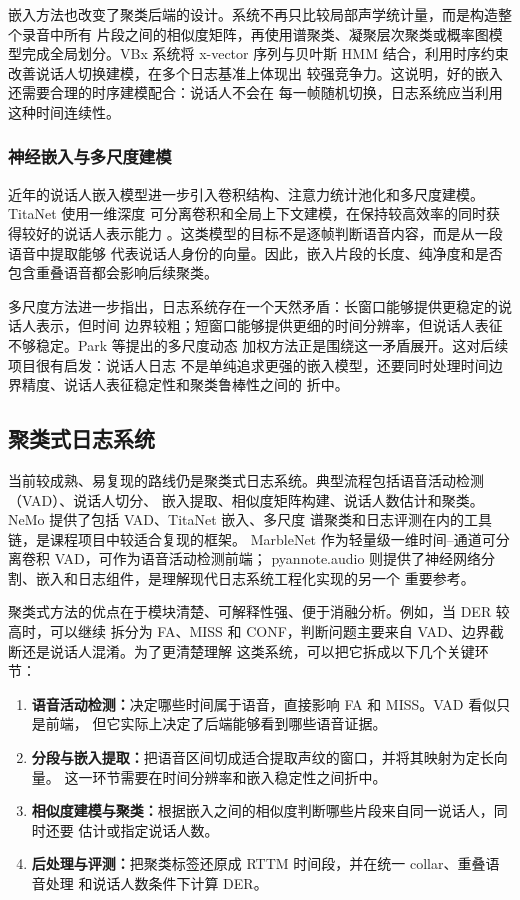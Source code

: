 \documentclass[UTF8,a4paper,10pt]{ctexart}
\begin{document}
嵌入方法也改变了聚类后端的设计。系统不再只比较局部声学统计量，而是构造整个录音中所有
片段之间的相似度矩阵，再使用谱聚类、凝聚层次聚类或概率图模型完成全局划分。VBx 系统将
x-vector 序列与贝叶斯 HMM 结合，利用时序约束改善说话人切换建模，在多个日志基准上体现出
较强竞争力\cite{landini2020vbx}。这说明，好的嵌入还需要合理的时序建模配合：说话人不会在
每一帧随机切换，日志系统应当利用这种时间连续性。

\subsubsection{神经嵌入与多尺度建模}

近年的说话人嵌入模型进一步引入卷积结构、注意力统计池化和多尺度建模。TitaNet 使用一维深度
可分离卷积和全局上下文建模，在保持较高效率的同时获得较好的说话人表示能力
\cite{koluguri2022titanet}。这类模型的目标不是逐帧判断语音内容，而是从一段语音中提取能够
代表说话人身份的向量。因此，嵌入片段的长度、纯净度和是否包含重叠语音都会影响后续聚类。

多尺度方法进一步指出，日志系统存在一个天然矛盾：长窗口能够提供更稳定的说话人表示，但时间
边界较粗；短窗口能够提供更细的时间分辨率，但说话人表征不够稳定。Park 等提出的多尺度动态
加权方法正是围绕这一矛盾展开\cite{park2022multiscale}。这对后续项目很有启发：说话人日志
不是单纯追求更强的嵌入模型，还要同时处理时间边界精度、说话人表征稳定性和聚类鲁棒性之间的
折中。

\subsection{聚类式日志系统}

当前较成熟、易复现的路线仍是聚类式日志系统。典型流程包括语音活动检测（VAD）、说话人切分、
嵌入提取、相似度矩阵构建、说话人数估计和聚类。NeMo 提供了包括 VAD、TitaNet 嵌入、多尺度
谱聚类和日志评测在内的工具链，是课程项目中较适合复现的框架\cite{kuchaiev2019nemo}。
MarbleNet 作为轻量级一维时间--通道可分离卷积 VAD，可作为语音活动检测前端\cite{jia2021marblenet}；
pyannote.audio 则提供了神经网络分割、嵌入和日志组件，是理解现代日志系统工程化实现的另一个
重要参考\cite{bredin2020pyannote}。

聚类式方法的优点在于模块清楚、可解释性强、便于消融分析。例如，当 DER 较高时，可以继续
拆分为 FA、MISS 和 CONF，判断问题主要来自 VAD、边界截断还是说话人混淆。为了更清楚理解
这类系统，可以把它拆成以下几个关键环节：

\begin{enumerate}
  \item \textbf{语音活动检测：}决定哪些时间属于语音，直接影响 FA 和 MISS。VAD 看似只是前端，
  但它实际上决定了后端能够看到哪些语音证据。
  \item \textbf{分段与嵌入提取：}把语音区间切成适合提取声纹的窗口，并将其映射为定长向量。
  这一环节需要在时间分辨率和嵌入稳定性之间折中。
  \item \textbf{相似度建模与聚类：}根据嵌入之间的相似度判断哪些片段来自同一说话人，同时还要
  估计或指定说话人数。
  \item \textbf{后处理与评测：}把聚类标签还原成 RTTM 时间段，并在统一 collar、重叠语音处理
  和说话人数条件下计算 DER。
\end{enumerate}
\end{document}
